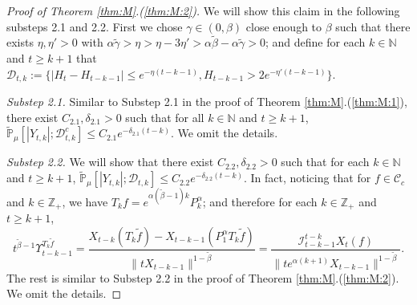 \documentclass[12pt,a4paper]{amsart}
\theoremstyle{plain}
\theoremstyle{definition}
\numberwithin{equation}{section}
\begin{document}
\begin{proof}[Proof of Theorem \ref{thm:M}.(\ref{thm:M:2})]
  We will show this claim in the following substeps 2.1 and 2.2.
  First we chose $\gamma \in (0,\beta)$ close enough to $\beta$ such that there exists $\eta,\eta'>0$ with $ \alpha \tilde \gamma > \eta > \eta - 3\eta' > \alpha \tilde \beta - \alpha \tilde \gamma > 0$; and define for each $k \in \mathbb N$ and $t\geq k+1$ that $ \mathcal{D}_{t,k} := \{|H_t-H_{t-k-1}| \leq  e^{-\eta (t-k-1)}, H_{t-k-1}> 2e^{-\eta' (t-k-1)}\}$.

  \emph{Substep 2.1.}
  Similar to Substep 2.1 in the proof of Theorem \ref{thm:M}.(\ref{thm:M:1}), there exist $C_{2.1},\delta_{2.1} >0$ such that for all $k \in \mathbb N$ and $t\geq k+1$, $\mathbb{\widetilde{P}}_{\mu}[|Y_{t,k}|;\mathcal{D}^c_{t,k}] \leq C_{2.1} e^{-\delta_{2.1} (t-k)}$.
  We omit the details.

  \emph{Substep 2.2.} We will show that there exist $C_{2.2},\delta_{2.2} > 0$ such that for each $k\in \mathbb N$ and $t\geq k+1$, $ \mathbb{\widetilde{P}}_{\mu}[|Y_{t,k}|;\mathcal{D}_{t,k}] \leq  C_{2.2} e^{-\delta_{2.2} (t-k)}.$
  In fact, noticing that for $f\in \mathcal C_c$ and $k\in \mathbb Z_+$, we have $T_kf = e^{\alpha (\tilde \beta - 1 )k}P_k^\alpha $; and therefore for each $k\in \mathbb Z_+$ and $t \geq k + 1$,
  \[
    t^{\tilde \beta - 1} \Upsilon_{t-k-1}^{T_{k} \tilde f}
    = \frac{X_{t-k}(T_{k} \tilde f) - X_{t -k-1}(P_1^\alpha T_{k} \tilde f)}{\|t X_{t-k-1}\|^{1-\tilde \beta}}
    = \frac{\mathcal I_{t - k - 1}^{t - k} X_t(f)}{\|te^{\alpha (k+1)}X_{t-k-1} \|^{1 -\tilde \beta}}.
  \]
  The rest is similar to Substep 2.2 in the proof of Theorem \ref{thm:M}.(\ref{thm:M:2}).
  We omit the details.


\end{proof}
\end{document}
